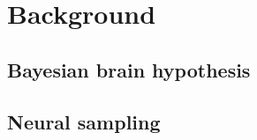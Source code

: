 \section{Background}\label{sec:Theory}

\subsection{Bayesian brain hypothesis}


\subsection{Neural sampling}
